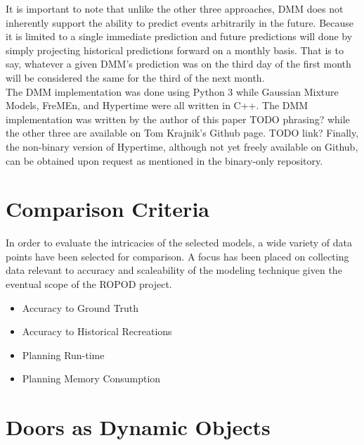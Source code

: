   It is important to note that unlike the other three approaches, DMM does
  not inherently support the ability to predict events arbitrarily in the future.
  Because it is limited to a single immediate prediction and future predictions
  will done by simply projecting historical predictions forward on a monthly basis.
  That is to say, whatever a given DMM's prediction was on the third day of the first month
  will be considered the same for the third of the next month. \\

  The DMM implementation was done using Python 3 while Gaussian Mixture
  Models, FreMEn, and Hypertime were all written in C++. The DMM implementation
  was written by the author of this paper TODO phrasing? while the other three
  are available on Tom Krajnik's Github page. TODO link? Finally, the non-binary
  version of Hypertime, although not yet freely available on Github, can
  be obtained upon request as mentioned in the binary-only repository. \\




  \section{ Comparison Criteria }
  In order to evaluate the intricacies of the selected models, a wide variety
  of data points have been selected for comparison. A focus has been placed on
  collecting data relevant to accuracy and scaleability of the modeling
  technique given the eventual scope of the ROPOD project. \\

  \begin{itemize}

    \item Accuracy to Ground Truth

    \item Accuracy to Historical Recreations

    \item Planning Run-time

    \item Planning Memory Consumption

  \end{itemize}

  \section{ Doors as Dynamic Objects }

